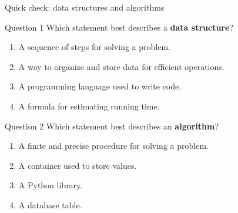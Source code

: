 \documentclass[aspectratio=169]{beamer}
\begin{document}
\begin{frame}{Quick check: data structures and algorithms}
  \small

  \begin{block}{Question 1}
    Which statement best describes a \textbf{data structure}?
    \begin{enumerate}
      \item A sequence of steps for solving a problem.
      \item A way to organize and store data for efficient operations.
      \item A programming language used to write code.
      \item A formula for estimating running time.
    \end{enumerate}
  \end{block}

  \begin{exampleblock}{Question 2}
    Which statement best describes an \textbf{algorithm}?
    \begin{enumerate}
      \item A finite and precise procedure for solving a problem.
      \item A container used to store values.
      \item A Python library.
      \item A database table.
    \end{enumerate}
  \end{exampleblock}

\end{frame}
\end{document}
